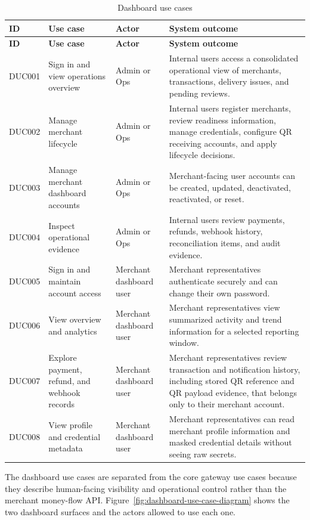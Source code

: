\begin{longtable}{L{0.11\textwidth}L{0.26\textwidth}L{0.18\textwidth}L{0.27\textwidth}}
\caption{Dashboard use cases}\\
\toprule
\textbf{ID} & \textbf{Use case} & \textbf{Actor} & \textbf{System outcome} \\
\midrule
\endfirsthead
\toprule
\textbf{ID} & \textbf{Use case} & \textbf{Actor} & \textbf{System outcome} \\
\midrule
\endhead
DUC001 & Sign in and view operations overview & Admin or Ops & Internal users access a consolidated operational view of merchants, transactions, delivery issues, and pending reviews. \\
\bodyrowrule
DUC002 & Manage merchant lifecycle & Admin or Ops & Internal users register merchants, review readiness information, manage credentials, configure QR receiving accounts, and apply lifecycle decisions. \\
\bodyrowrule
DUC003 & Manage merchant dashboard accounts & Admin or Ops & Merchant-facing user accounts can be created, updated, deactivated, reactivated, or reset. \\
\bodyrowrule
DUC004 & Inspect operational evidence & Admin or Ops & Internal users review payments, refunds, webhook history, reconciliation items, and audit evidence. \\
\bodyrowrule
DUC005 & Sign in and maintain account access & Merchant dashboard user & Merchant representatives authenticate securely and can change their own password. \\
\bodyrowrule
DUC006 & View overview and analytics & Merchant dashboard user & Merchant representatives view summarized activity and trend information for a selected reporting window. \\
\bodyrowrule
DUC007 & Explore payment, refund, and webhook records & Merchant dashboard user & Merchant representatives review transaction and notification history, including stored QR reference and QR payload evidence, that belongs only to their merchant account. \\
\bodyrowrule
DUC008 & View profile and credential metadata & Merchant dashboard user & Merchant representatives can read merchant profile information and masked credential details without seeing raw secrets. \\
\bottomrule
\end{longtable}

The dashboard use cases are separated from the core gateway use cases because
they describe human-facing visibility and operational control rather than the
merchant money-flow API. Figure~\ref{fig:dashboard-use-case-diagram} shows the
two dashboard surfaces and the actors allowed to use each one.

